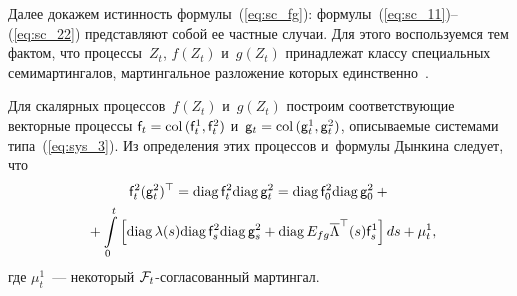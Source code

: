 \begin{multicols}{2}
{   Далее докажем истинность формулы~(\ref{eq:sc_fg}): формулы~(\ref{eq:sc_11})--(\ref{eq:sc_22}) представляют собой ее частные случаи. Для этого воспользуемся 
тем фактом, что процессы~$Z_t$, $f(Z_t)$ и~$g(Z_t)$ принадлежат классу 
специальных семимартингалов, мартингальное разложение которых единственно~\cite{LSh_86}.

   Для скалярных процессов~$f(Z_t)$ и~$g(Z_t)$ построим соответствующие 
векторные процессы $\mathsf{f}_t \hm= \mathrm{col}\,(\mathsf{f}_t^1,\mathsf{f}_t^2)$ 
и~$\mathsf{g}_t \hm= \mathrm{col}\,(\mathsf{g}_t^1,\mathsf{g}_t^2)$, описываемые системами типа~(\ref{eq:sys_3}). 
Из определения этих процессов и~формулы Дынкина следует, что
  \begin{multline*}
   \mathsf{f}_t^2 (\mathsf{g}_t^2)^{\top} = \mathrm{diag}\,\mathsf{f}_t^2  \mathrm{diag}\,
\mathsf{g}_t^2 = \mathrm{diag}\, \mathsf{f}_0^2  \mathrm{diag}\, \mathsf{g}_0^2 +{}\\
{}+ \int\limits_0^t
   \left[
  \mathrm{diag}\, \lambda(s) \mathrm{diag}\, \mathsf{f}^2_s \mathrm{diag}\, \mathsf{g}^2_s + \mathrm{diag}\, E_{fg} 
\overline{\Lambda}^{\top}(s) \mathsf{f}^1_s
   \right]ds + \mu_t^1,\hspace*{-2.26256pt}
   \end{multline*}
   где $\mu_t^1$~--- некоторый ${\mathcal F}_t$-со\-гла\-со\-ван\-ный мартингал.

}
\end{multicols}
